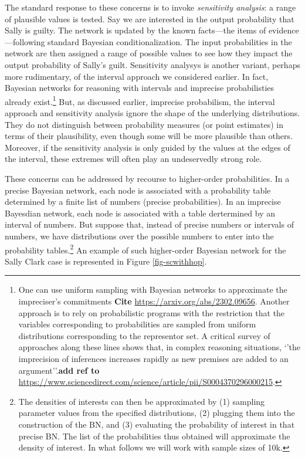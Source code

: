 \documentclass[
  letterpaper,
  DIV=11,
  numbers=noendperiod]{scrartcl}
\begin{document}
The standard response to these concerns is to invoke \emph{sensitivity
analysis}: a range of plausible values is tested. Say we are interested
in the output probability that Sally is guilty. The network is updated
by the known facts---the items of evidence---following standard Bayesian
conditionalization. The input probabilities in the network are then
assigned a range of possible values to see how they impact the output
probability of Sally's guilt. Sensitivity analysys is another variant,
perhaps more rudimentary, of the interval approach we considered
earlier.  In fact,
Bayesian networks for reasoning with intervals and imprecise
probabilisties already exist.\footnote{One can use uniform sampling with
  Bayesian networks to approximate the impreciser's commitments
  \textbf{Cite} \url{https://arxiv.org/abs/2302.09656}. Another approach
  is to rely on probabilistic programs with the restriction that the
  variables corresponding to probabilities are sampled from uniform
  distributions corresponding to the representor set. A critical survey
  of approaches along these lines shows that, in complex reasoning
  situations, `'the imprecision of inferences increases rapidly as new
  premises are added to an argument''.\textbf{add ref to}
  \url{https://www.sciencedirect.com/science/article/pii/S0004370296000215}.}
But, as discussed earlier, imprecise probabilism, the interval approach
and sensitivity analysis ignore the shape of the underlying
distributions. They do not distinguish between probability measures (or
point estimates) in terms of their plausibility, even though some will
be more plausible than others. Moreover, if the sensitivity analysis is
only guided by the values at the edges of the interval, these extremes
will often play an undeservedly strong role.

These concerns can be addressed by recourse to higher-order
probabilities. In a precise Bayesian network, each node is associated
with a probability table determined by a finite list of numbers (precise
probabilities). In an imprecise Bayesdian network, each node is
associated with a table dertermined by an interval of numbers. But
suppose that, instead of precise numbers or intervals of numbers, we
have distributions over the possible numbers to enter into the
probability tables.\footnote{The densities of interests can then be
  approximated by (1) sampling parameter values from the specified
  distributions, (2) plugging them into the construction of the BN, and
  (3) evaluating the probability of interest in that precise BN. The
  list of the probabilities thus obtained will approximate the density
  of interest. In what follows we will work with sample sizes of 10k.}
An example of such higher-order Bayesian network for the Sally Clark
case is represented in Figure \ref{fig-scwithhop}.
\end{document}
